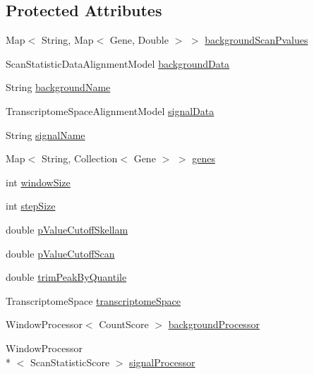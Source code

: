 \subsection*{Protected Attributes}
\begin{DoxyCompactItemize}
\item 
Map$<$ String, Map$<$ Gene, Double $>$ $>$ \hyperlink{classbroad_1_1pda_1_1seq_1_1protection_1_1_two_sample_scan_skellam_peak_caller_a7cbbb67ec1f14cb07882c912a4d93bc9}{background\+Scan\+Pvalues}
\item 
Scan\+Statistic\+Data\+Alignment\+Model \hyperlink{classbroad_1_1pda_1_1seq_1_1protection_1_1_two_sample_scan_skellam_peak_caller_a79e347f2a757fac64417c6ab5ef20fc8}{background\+Data}
\item 
String \hyperlink{classbroad_1_1pda_1_1seq_1_1protection_1_1_two_sample_scan_skellam_peak_caller_a1962b88663013c70dc8e16b06acca0fa}{background\+Name}
\item 
Transcriptome\+Space\+Alignment\+Model \hyperlink{classbroad_1_1pda_1_1seq_1_1protection_1_1_two_sample_scan_skellam_peak_caller_a0e010f18c5cc10693cb6efd34385fb41}{signal\+Data}
\item 
String \hyperlink{classbroad_1_1pda_1_1seq_1_1protection_1_1_two_sample_scan_skellam_peak_caller_ad9eccd44514f233b9dbaa542e8cdc59d}{signal\+Name}
\item 
Map$<$ String, Collection$<$ Gene $>$ $>$ \hyperlink{classbroad_1_1pda_1_1seq_1_1protection_1_1_two_sample_scan_skellam_peak_caller_a04a2a9a97512a37b8b24c458e11c6fe3}{genes}
\item 
int \hyperlink{classbroad_1_1pda_1_1seq_1_1protection_1_1_two_sample_scan_skellam_peak_caller_a31e1735c164e6abc0e4514648588fb06}{window\+Size}
\item 
int \hyperlink{classbroad_1_1pda_1_1seq_1_1protection_1_1_two_sample_scan_skellam_peak_caller_ad9f06a4eaef0c155a2b6a908bed38223}{step\+Size}
\item 
double \hyperlink{classbroad_1_1pda_1_1seq_1_1protection_1_1_two_sample_scan_skellam_peak_caller_ad1d91387c971684dd380551417f389d2}{p\+Value\+Cutoff\+Skellam}
\item 
double \hyperlink{classbroad_1_1pda_1_1seq_1_1protection_1_1_two_sample_scan_skellam_peak_caller_a9ca79f771b6e9a3e152f4bbea7dd9fac}{p\+Value\+Cutoff\+Scan}
\item 
double \hyperlink{classbroad_1_1pda_1_1seq_1_1protection_1_1_two_sample_scan_skellam_peak_caller_a9fc55834e17b7bb0b96ff309c4f2a161}{trim\+Peak\+By\+Quantile}
\item 
Transcriptome\+Space \hyperlink{classbroad_1_1pda_1_1seq_1_1protection_1_1_two_sample_scan_skellam_peak_caller_ab8b7bde00305f7d255fb889abd517750}{transcriptome\+Space}
\item 
Window\+Processor$<$ Count\+Score $>$ \hyperlink{classbroad_1_1pda_1_1seq_1_1protection_1_1_two_sample_scan_skellam_peak_caller_a2eb12fd217a0a6f6a7a733d9c525ccdb}{background\+Processor}
\item 
Window\+Processor\\*
$<$ Scan\+Statistic\+Score $>$ \hyperlink{classbroad_1_1pda_1_1seq_1_1protection_1_1_two_sample_scan_skellam_peak_caller_a262dec7274dd2c19ec9854f60f873213}{signal\+Processor}
\end{DoxyCompactItemize}
